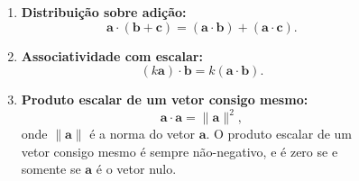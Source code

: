 \documentclass[a4paper, 14pt, twoside]{article}
\begin{document}
\begin{figure}[h]
\begin{minipage}[t]{0.60\textwidth}
\begin{enumerate}
            \item \textbf{Distribuição sobre adição:}
            \[
            \mathbf{a} \cdot (\mathbf{b} + \mathbf{c}) = (\mathbf{a} \cdot \mathbf{b}) + (\mathbf{a} \cdot \mathbf{c}).
            \]
            
            \item \textbf{Associatividade com escalar:}
            \[
            (k \mathbf{a}) \cdot \mathbf{b} = k (\mathbf{a} \cdot \mathbf{b}).
            \]
            
            \item \textbf{Produto escalar de um vetor consigo mesmo:}
            \[
            \mathbf{a} \cdot \mathbf{a} = \|\mathbf{a}\|^2,
            \]
            onde \( \|\mathbf{a}\| \) é a norma do vetor \( \mathbf{a} \). O produto escalar de um vetor consigo mesmo é sempre não-negativo, e é zero se e somente se \( \mathbf{a} \) é o vetor nulo.
        \end{enumerate}
    \end{minipage}

\end{figure}
\end{document}
